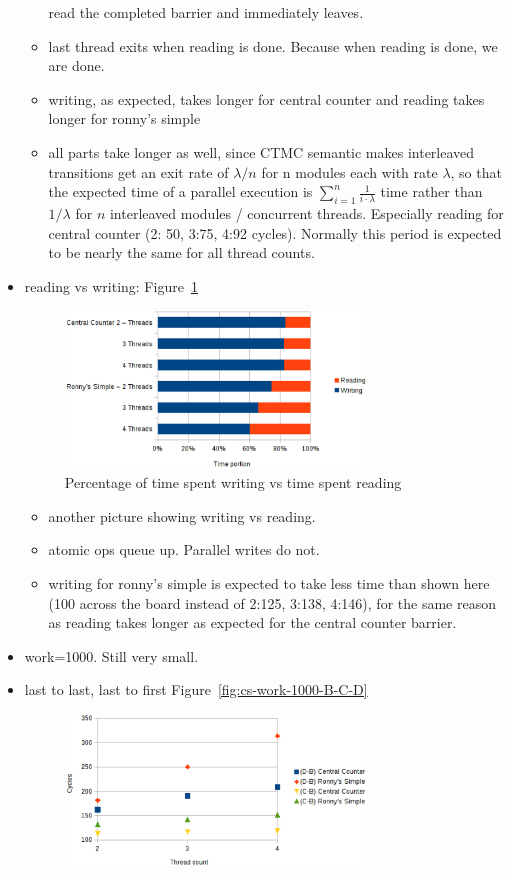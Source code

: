 \documentclass[a4paper, 10pt]{article}
\begin{document}
\begin{itemize}
\begin{itemize}
				read the completed barrier and immediately leaves.
			\item last thread exits when reading is done. Because when reading is done, we are done.
			\item writing, as expected, takes longer for central counter and reading takes longer for ronny's simple
			\item all parts take longer as well, since CTMC semantic makes interleaved transitions get an exit rate of $\lambda / n$ for n modules each with rate $\lambda$, so that the expected time of a parallel execution is $\sum_{i=1}^{n} \frac{1}{i \cdot \lambda}$  time rather than $1 / \lambda$ for $n$ interleaved modules / concurrent threads. Especially reading for central counter (2: 50, 3:75, 4:92 cycles). Normally this period is expected to be nearly the same for all thread counts.
		\end{itemize}
	\item reading vs writing: Figure~\ref{fig:cs-work-100-percent}
		\begin{figure}[htbp]
			\centering
			\includegraphics[width=8cm]{charts/cs-work-100-percent}
			\caption{Percentage of time spent writing vs time spent reading}
			\label{fig:cs-work-100-percent}
		\end{figure}
		\begin{itemize}
			\item another picture showing writing vs reading.
			\item atomic ops queue up. Parallel writes do not.
			\item writing for ronny's simple is expected to take less time than shown here (100 across the board instead of 2:125, 3:138, 4:146), for the same reason as reading takes longer as expected for the central counter barrier.
		\end{itemize}
	\item work=1000. Still very small.
	\item last to last, last to first Figure~\ref{fig:cs-work-1000-B-C-D}
		\begin{figure}[htbp]
			\centering
			\includegraphics[width=8cm]{charts/cs-work-1000-B-C-D}

\end{figure}
\end{itemize}
\end{document}
